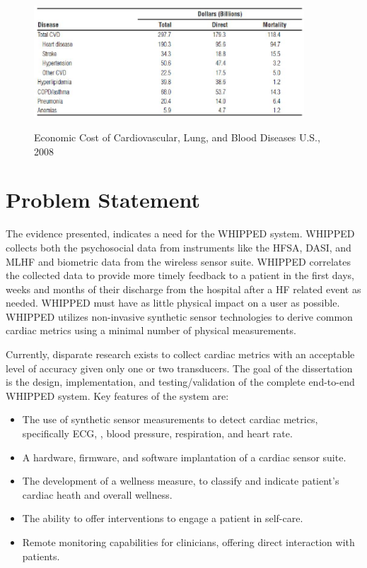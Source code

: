 \begin{figure}
	\begin{center}
		\label{fig:CVDCost}
		\includegraphics[scale=1,width=0.9\textwidth]{Images/CostOfCVD.jpg} 
		\caption{Economic Cost of Cardiovascular, Lung, and Blood Diseases U.S., 2008 }
	\end{center}
\end{figure}

\section{Problem Statement}
\label{sec:problemStatement}
The evidence presented, indicates a need for the WHIPPED system. WHIPPED collects both the psychosocial data from instruments like the HFSA, DASI, and MLHF and biometric data from the wireless sensor suite.  WHIPPED correlates the collected data to provide more timely feedback to a patient in the first days, weeks and months of their discharge from the hospital after a HF related event as needed. WHIPPED must have as little physical impact on a user as possible. WHIPPED utilizes non-invasive synthetic sensor technologies to derive common cardiac metrics using a minimal number of physical measurements. 

Currently, disparate research exists to collect cardiac metrics with an acceptable level of accuracy given only one or two transducers. The goal of the dissertation is the design, implementation, and testing/validation of the complete end-to-end WHIPPED system. Key features of the system are:

\begin{itemize}
\item The use of synthetic sensor measurements to detect cardiac metrics, specifically ECG, , blood pressure, respiration, and heart rate.
\item A hardware, firmware, and software implantation of a cardiac sensor suite.
\item The development of a wellness measure, to classify and indicate patient's cardiac heath and overall wellness. \cite{Chaiyasucheeva2012}
\item The ability to offer interventions to engage a patient in self-care.
\item Remote monitoring capabilities for clinicians, offering direct interaction with patients.
\end{itemize}


